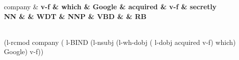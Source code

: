 \documentclass{article}
\begin{document}
\thispagestyle{empty}
\begin{center}
 \begin{dependency}[theme = default]
   \begin{deptext}[column sep=1em]
   company \& \color{blue} \bf v-f \& which \& Google \& acquired \& \color{red} \bf v-f \& secretly \\
   NN \& \& WDT \& NNP \& VBD \&  \& RB \\
   \end{deptext}
\end{dependency} \\
\small (l-rcmod company ({\color{blue} l-BIND} (l-nsubj (l-wh-dobj ({\color{red} l-dobj} acquired {\color{red} v-f}) which) Google) {\color{blue} v-f}))
\end{center}
\end{document}
